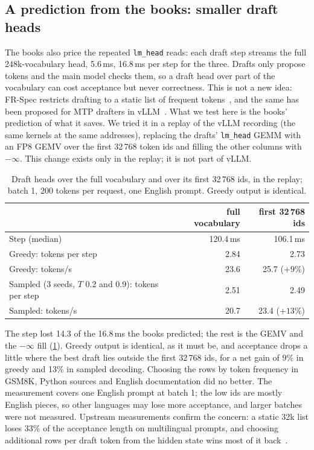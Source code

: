 \subsection{A prediction from the books: smaller draft heads}\label{sec:drafthead}

The books also price the repeated \texttt{lm\_head} reads: each draft step streams the full
248k-vocabulary head, 5.6\,ms, 16.8\,ms per step for the three. Drafts only propose tokens and the main model checks them, so a draft head over part of the vocabulary can cost acceptance but never correctness. This is not a new idea: FR-Spec restricts drafting to a static list of frequent tokens~\cite{zhao2025frspec}, and the same has been proposed for MTP drafters in vLLM~\cite{vllmissue58578,vllmissue67220}. What we test here is the books' prediction of what it saves. We tried it in a replay of the vLLM recording (the same kernels at the same
addresses), replacing the drafts' \texttt{lm\_head} GEMM with an FP8 GEMV over the first 32\,768
token ids and filling the other columns with $-\infty$. This change exists only in the replay; it
is not part of vLLM.

\begin{table}[t]
\centering\small
\begin{tabular}{@{}lrr@{}}
\toprule
 & full vocabulary & first 32\,768 ids \\
\midrule
Step (median) & 120.4\,ms & 106.1\,ms \\
Greedy: tokens per step & 2.84 & 2.73 \\
Greedy: tokens/s & 23.6 & 25.7 ($+9\%$) \\
Sampled (3 seeds, $T$ 0.2 and 0.9): tokens per step & 2.51 & 2.49 \\
Sampled: tokens/s & 20.7 & 23.4 ($+13\%$) \\
\bottomrule
\end{tabular}
\caption{Draft heads over the full vocabulary and over its first 32\,768 ids, in the replay; batch 1, 200 tokens per request, one English prompt. Greedy output is identical.}\label{tab:drafthead}
\end{table}

The step lost 14.3 of the 16.8\,ms the books predicted; the rest is the GEMV and the $-\infty$
fill (\cref{tab:drafthead}). Greedy output is identical, as it must be, and acceptance drops a
little where the best draft lies outside the first 32\,768 ids, for a net gain of 9\% in greedy and
13\% in sampled decoding. Choosing the rows by token frequency in GSM8K, Python sources and English
documentation did no better. The measurement covers one English prompt at batch 1; the low ids
are mostly English pieces, so other languages may lose more acceptance, and larger batches were not measured. Upstream measurements confirm the concern: a static 32k
list loses 33\% of the acceptance length on multilingual prompts, and choosing additional rows per
draft token from the hidden state wins most of it back~\cite{vllmissue67220}.

